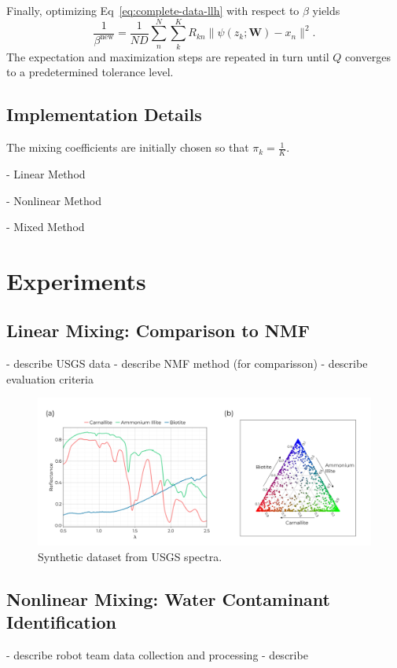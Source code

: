 \documentclass[remotesensing,article,submit,pdftex,moreauthors]{Definitions/mdpi}
\begin{document}
Finally, optimizing Eq~\ref{eq:complete-data-llh} with respect to $\beta$ yields
\begin{equation}\label{eq:beta-update}
    \frac{1}{\beta^{\text{new}}}  = \frac{1}{ND}\sum\limits_n^N\sum\limits_k^K R_{kn}\lVert \psi(z_k; \mathbf{W}) - x_n \rVert^2.
\end{equation}
The expectation and maximization steps are repeated in turn until $Q$ converges to a predetermined tolerance level.

\subsection{Implementation Details}

The mixing coefficients are initially chosen so that $\pi_k = \frac{1}{K}$.

- Linear Method

- Nonlinear Method

- Mixed Method


\section{Experiments}\label{sec:experiments}
\subsection{Linear Mixing: Comparison to NMF}
- describe USGS data
- describe NMF method (for comparisson)
- describe evaluation criteria


\begin{figure}[H]
\includegraphics[width=\columnwidth]{methods/usgs/usgs-dataset.pdf}
\caption{Synthetic dataset from USGS spectra. \label{fig:usgs-data}}
\end{figure}  




\subsection{Nonlinear Mixing: Water Contaminant Identification}
- describe robot team data collection and processing
- describe 
\end{document}
